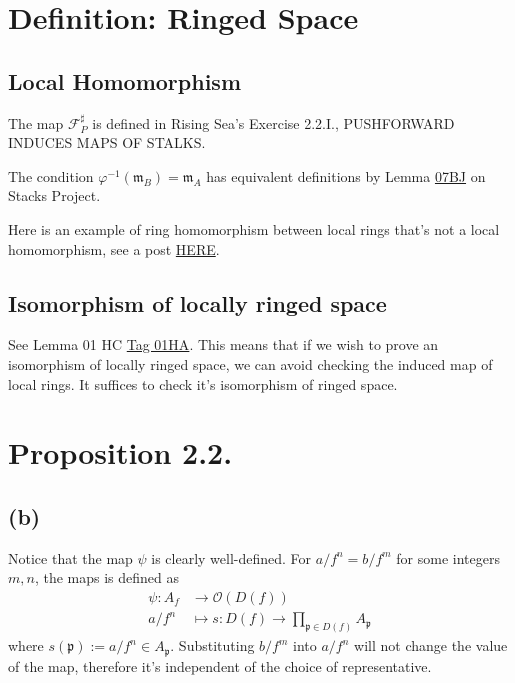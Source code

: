 \section{Definition: Ringed Space}

\subsection{Local Homomorphism}

The map $\mathscr F^{\sharp}_P$ is defined in Rising Sea's Exercise 2.2.I., PUSHFORWARD INDUCES MAPS OF STALKS.

The condition $\varphi^{-1}(\mathfrak m_B)=\mathfrak m_A$ has equivalent definitions by Lemma \href{https://stacks.math.columbia.edu/tag/07BH}{07BJ} on Stacks Project.

Here is an example of ring homomorphism between local rings that's not a local homomorphism, see a post \href{https://math.stackexchange.com/questions/3752503/example-of-non-local-homomorphism-on-local-rings}{HERE}.

\subsection{Isomorphism of locally ringed space}
See Lemma 01 HC \href{https://stacks.math.columbia.edu/tag/01HA}{Tag 01HA}. This means that if we wish to prove an isomorphism of locally ringed space, we can avoid checking the induced map of local rings. It suffices to check it's isomorphism of ringed space. 

\section{Proposition 2.2.}

\subsection{(b)}

Notice that the map $\psi$ is clearly well-defined.
For $a/f^n=b/f^m$ for some integers $m,n$, the maps is defined as 
\begin{align*}
    \psi:A_f &\to \mathcal O(D(f))\\
    a/f^n &\mapsto s: D(f)\to\prod_{\mathfrak p\in D(f)}A_{\mathfrak p}
\end{align*}where $s(\mathfrak p):=a/f^n\in A_{\mathfrak p}$. Substituting $b/f^m$ into $a/f^n$ will not change the value of the map, therefore it's independent of the choice of representative.

